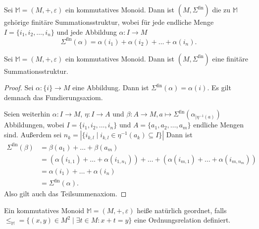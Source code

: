 \documentclass{article}
\begin{document}
\begin{definition}
  Sei $\mathbb{M} = (M, +, \varepsilon)$ ein  kommutatives Monoid.
  Dann ist $(M, \Sigma^\text{fin})$ die zu $\mathbb{M}$ gehörige finitäre Summationsstruktur,
  wobei für jede endliche Menge $I = \{i_1, i_2, \dots, i_n\}$
  und jede Abbildung $\alpha \colon I \to M$ 
  \begin{equation*}
    \Sigma^\text{fin}(\alpha) = \alpha(i_1) + \alpha(i_2) + \dots + \alpha(i_n).
  \end{equation*}
\end{definition}

\begin{theorem}
  Sei $\mathbb{M} = (M, +, \varepsilon)$ ein  kommutatives Monoid.
  Dann ist $(M, \Sigma^\text{fin})$ eine finitäre Summationsstruktur.
\end{theorem}
\begin{proof}
  Sei $\alpha \colon \{i\} \to M$ eine Abbildung.
  Dann ist $\Sigma^\text{fin}(\alpha) = \alpha(i)$.
  Es gilt demnach das Fundierungsaxiom.

  Seien weiterhin $\alpha \colon I \to M$,
  $\eta \colon I \to A$ und $\beta \colon A \to M, a \mapsto \Sigma^\text{fin}(\alpha_{\mid \eta^{-1}(a)})$
  Abbildungen, wobei $I = \{i_1, i_2, \dots, i_n\}$ und $A = \{a_1, a_2, \dots, a_m\}$ endliche Mengen sind.
  Außerdem sei $n_k = |\{ i_{k,l} \mid i_{k,l} \in \eta^{-1}(a_k) \subseteq I \}|$
  Dann ist 
  \begin{align*}
    \Sigma^\text{fin}(\beta)
    &= \beta(a_1) + \dots + \beta(a_m) \\
    &= (\alpha(i_{1,1}) + \dots + \alpha(i_{1,n_1})) + \dots + (\alpha(i_{m,1}) + \dots + \alpha(i_{m,n_m})) \\
    &= \alpha(i_1) + \dots + \alpha(i_n) \\
    &= \Sigma^\text{fin}(\alpha).
  \end{align*}
  Also gilt auch das Teilsummenaxiom.
\end{proof}

\begin{definition}
  Ein kommutatives Monoid $\mathbb{M} = (M, +, \varepsilon)$ heiße natürlich geordnet,
  falls $\leq_\mathbb{M} = \{ (x, y) \in M^2 \mid \exists t \in M \colon x + t = y \}$ eine Ordnungsrelation definiert.
\end{definition}
\end{document}
